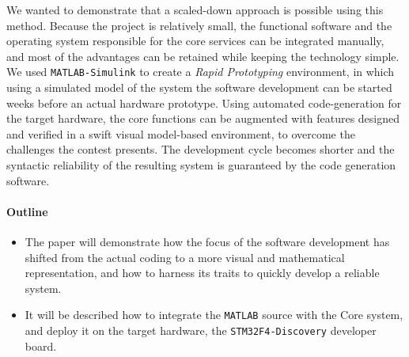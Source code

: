 
We wanted to demonstrate that a scaled-down approach is possible using this method. Because the project is relatively small, the functional software and the operating system responsible for the core services can be integrated manually, and most of the advantages can be retained while keeping the technology simple. We used \verb!MATLAB-Simulink! to create a \emph{Rapid Prototyping} environment, in which using a simulated model of the system the software development can be started weeks before an actual hardware prototype. Using automated code-generation for the target hardware, the core functions can be augmented with features designed and verified in a swift visual model-based environment, to overcome the challenges the contest presents. The development cycle becomes shorter and the syntactic reliability of the resulting system is guaranteed by the code generation software.

\paragraph{Outline}
\begin{itemize}
\item The paper will demonstrate how the focus of the software development has shifted from the actual coding to a more visual and mathematical representation, and how to harness its traits to quickly develop a reliable system.
\item It will be described how to integrate the \texttt{MATLAB} source with the Core system, and deploy it on the target hardware, the \verb!STM32F4-Discovery! developer board.
\end{itemize}